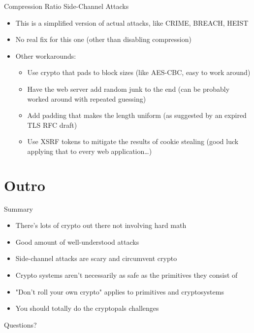 \documentclass[presentation]{beamer}
\begin{document}
\begin{frame}[label=sec-2-36]{Compression Ratio Side-Channel Attacks}
\begin{itemize}
\item This is a simplified version of actual attacks, like CRIME, BREACH,
HEIST
\item No real fix for this one (other than disabling compression)
\item Other workarounds:
\begin{itemize}
\item Use crypto that pads to block sizes (like AES-CBC, easy to work
around)
\item Have the web server add random junk to the end (can be probably
worked around with repeated guessing)
\item Add padding that makes the length uniform (as suggested by an
expired TLS RFC draft)
\item Use XSRF tokens to mitigate the results of cookie stealing
(good luck applying that to every web application\ldots{})
\end{itemize}
\end{itemize}
\end{frame}

\section{Outro}
\label{sec-3}

\begin{frame}[label=sec-3-1]{Summary}
\begin{itemize}
\item There's lots of crypto out there not involving hard math
\item Good amount of well-understood attacks
\item Side-channel attacks are scary and circumvent crypto
\item Crypto systems aren't necessarily as safe as the primitives they
consist of
\item "Don't roll your own crypto" applies to primitives \alert{and}
  cryptosystems
\item You should totally do the cryptopals challenges
\end{itemize}
\end{frame}

\begin{frame}[label=sec-3-2]{Questions?}
\end{frame}
\end{document}
